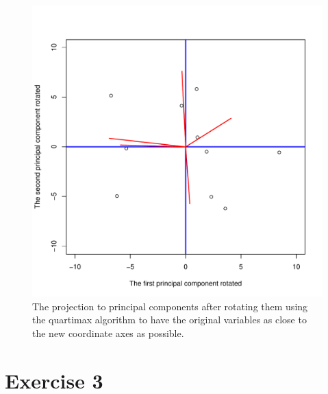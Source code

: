 \documentclass{article}
\begin{document}
\begin{figure}\centering
	\includegraphics[scale=\sscale]{qmax}
	\caption{The projection to principal components after rotating them using the quartimax algorithm to have the original variables as close to the new coordinate axes as possible.}\label{fig:qmax}
\end{figure}


\clearpage
\section{Exercise 3}
\end{document}
